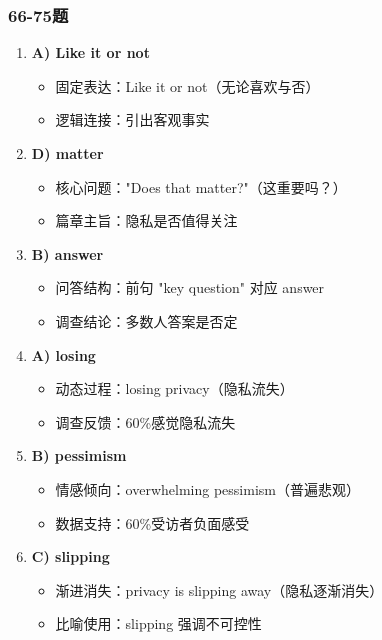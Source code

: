 \documentclass{article}
\begin{document}
\subsubsection*{66-75题}
\begin{enumerate}[resume*]
    \item \textbf{A) Like it or not} 
    \begin{itemize}
        \item 固定表达：Like it or not（无论喜欢与否）
        \item 逻辑连接：引出客观事实
    \end{itemize}
    
    \item \textbf{D) matter} 
    \begin{itemize}
        \item 核心问题："Does that matter?"（这重要吗？）
        \item 篇章主旨：隐私是否值得关注
    \end{itemize}
    
    \item \textbf{B) answer} 
    \begin{itemize}
        \item 问答结构：前句 "key question" 对应 answer
        \item 调查结论：多数人答案是否定
    \end{itemize}
    
    \item \textbf{A) losing} 
    \begin{itemize}
        \item 动态过程：losing privacy（隐私流失）
        \item 调查反馈：60\%感觉隐私流失
    \end{itemize}
    
    \item \textbf{B) pessimism} 
    \begin{itemize}
        \item 情感倾向：overwhelming pessimism（普遍悲观）
        \item 数据支持：60\%受访者负面感受
    \end{itemize}
    
    \item \textbf{C) slipping} 
    \begin{itemize}
        \item 渐进消失：privacy is slipping away（隐私逐渐消失）
        \item 比喻使用：slipping 强调不可控性
    \end{itemize}
    

\end{enumerate}
\end{document}
